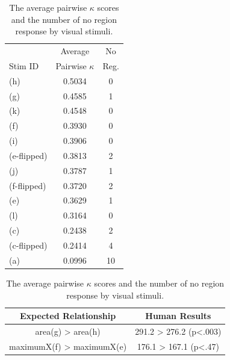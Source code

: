 \documentclass[11pt,letterpaper]{article}
\begin{document}


\begin{table}[t]
\parbox{.35\linewidth}{
\begin{tabular}{l c c}
 & Average & No \\
Stim ID & Pairwise $\kappa$ & Reg.\\
\hline
\hline
(h) & 0.5034 & 0\\ %
(g) & 0.4585 & 1\\ %
(k) & 0.4548 & 0\\ %
(f) & 0.3930 & 0\\ %
(i) & 0.3906 & 0\\ %
(e-flipped) & 0.3813 & 2\\ %
(j) & 0.3787 & 1\\ %
(f-flipped) & 0.3720 & 2\\ %
(e) & 0.3629 & 1\\ %
(l) & 0.3164& 0\\ %
(c) & 0.2438 & 2\\ %
(c-flipped) & 0.2414 & 4\\ %
(a) & 0.0996 & 10 \\ %
\hline
\end{tabular}
\label{tab:stimuli-kappa-scores}
\caption{The average pairwise $\kappa$ scores and the number of no region response by visual stimuli.}
}
\hfill
\parbox{.65\linewidth}{
\begin{tabular}{c c}
Expected Relationship & Human Results  \\
\hline
\hline
area(g) > area(h) & 291.2 > 276.2 (p<.003) \\
maximumX(f) > maximumX(e) & 176.1 > 167.1   (p<.47) \\

\end{tabular}}
\end{table}
\end{document}
